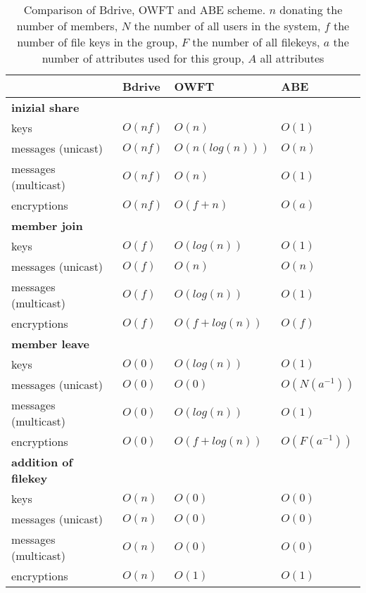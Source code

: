 \begin{table*}[!ht]
\centering
\begin{tabular}{l 		| l 						| l 						| l }
 						& \textbf{Bdrive}			& \textbf{OWFT} 			& \textbf{ABE} 		\\
\hline
\textbf{inizial share} 																				\\
keys 					& $O(nf)$ 					& $O(n)$	 				& $O(1)$			\\
messages (unicast)		& $O(nf)$  					& $O(n(log(n)))$			& $O(n)$			\\
messages (multicast) 	& $O(nf)$ 					& $O(n)$ 					& $O(1)$			\\
encryptions				& $O(nf)$ 					& $O(f + n)$				& $O(a)$ 			\\
\hline
\textbf{member join} 																				\\
keys 					& $O(f)$   					& $O(log(n))$				& $O(1)$			\\
messages (unicast)		& $O(f)$  					& $O(n)$  					& $O(n)$ 			\\
messages (multicast) 	& $O(f)$ 	 				& $O(log(n))$				& $O(1)$ 			\\
encryptions				& $O(f)$  					& $O(f + log(n))$			& $O(f)$ 			\\
\hline
\textbf{member leave}																				\\
keys 					& $O(0)$					& $O(log(n))$				& $O(1)$			\\
messages (unicast)		& $O(0)$					& $O(0)$  					& $O(N(a^{-1}))$	\\
messages (multicast)	& $O(0)$					& $O(log(n))$				& $O(1)$ 			\\ 
encryptions 			& $O(0)$					& $O(f + log(n))$ 			& $O(F(a^{-1}))$	\\
\hline	
\textbf{addition of filekey}																		\\
keys 					& $O(n)$	 				& $O(0)$					& $O(0)$			\\
messages (unicast)		& $O(n)$	 				& $O(0)$					& $O(0)$			\\
messages (multicast)	& $O(n)$ 					& $O(0)$ 					& $O(0)$			\\
encryptions				& $O(n)$ 					& $O(1)$					& $O(1)$			\\
\hline
\end{tabular}
\caption{Comparison of Bdrive, OWFT and ABE scheme. $n$ donating the number of members, $N$ the number of all users in the system, $f$ the number of file keys in the group, $F$ the number of all filekeys, $a$ the number of attributes used for this group, $A$ all attributes }
\label{tab:comparisonsOWFTtoABE}
\end{table*}

